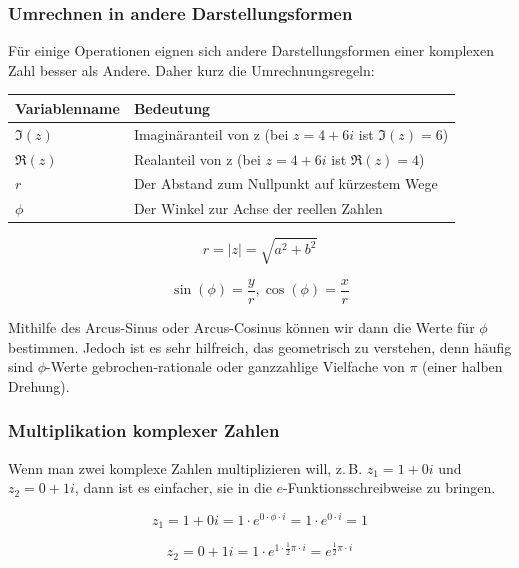 \documentclass{scrartcl}
\begin{document}
\subsubsection{Umrechnen in andere Darstellungsformen}

Für einige Operationen eignen sich andere Darstellungsformen einer komplexen Zahl besser als Andere. Daher kurz die Umrechnungsregeln:

\begin{tabular}{|l|l|}
	Variablenname & Bedeutung\\ \hline
	$\Im(z)$ & Imaginäranteil von z (bei $z = 4 + 6i$ ist $\Im(z) = 6$) \\
	$\Re(z)$ & Realanteil von z (bei $z = 4 + 6i$ ist $\Re(z) = 4$) \\
	$r$ & Der Abstand zum Nullpunkt auf kürzestem Wege \\
	$\phi$ & Der Winkel zur Achse der reellen Zahlen\\
\end{tabular}

\begin{equation}
	r = |z| = \sqrt{a^2 + b^2}
\end{equation}

\begin{equation}
	\sin(\phi) = \frac{y}{r}, 
	\cos(\phi) = \frac{x}{r}
\end{equation}

Mithilfe des Arcus-Sinus oder Arcus-Cosinus können wir dann die Werte für $\phi$ bestimmen. Jedoch ist es sehr hilfreich,
das geometrisch zu verstehen, denn häufig sind $\phi$-Werte gebrochen-rationale oder ganzzahlige Vielfache von $\pi$ (einer halben Drehung).

\subsubsection{Multiplikation komplexer Zahlen}

Wenn man zwei komplexe Zahlen multiplizieren will, z.\,B. $z_1 = 1 + 0i$ und $z_2 = 0 + 1i$, dann ist es einfacher,
sie in die $e$-Funktionsschreibweise zu bringen.

\begin{equation}
	z_1 = 1 + 0i = 1 \cdot e^{0\cdot \phi \cdot i} = 1 \cdot e^{0\cdot i} = 1
\end{equation}

\begin{equation}
	z_2 = 0 + 1i = 1 \cdot e^{1\cdot \frac{1}{2}\pi \cdot i} = e^{\frac{1}{2}\pi \cdot i}
\end{equation}
\end{document}
